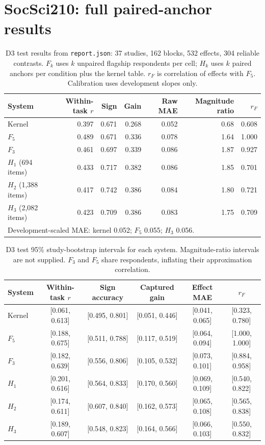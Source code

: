 \documentclass[11pt]{article}
\begin{document}
\section{SocSci210: full paired-anchor results}\label{app:d3}
\begin{table}[!htbp]
\centering\small
\caption{D3 test results from \texttt{report.json}: 37 studies, 162 blocks, 532 effects, 304 reliable contrasts. $F_k$ uses $k$ unpaired flagship respondents per cell; $H_k$ uses $k$ paired anchors per condition plus the kernel table. $r_F$ is correlation of effects with $F_5$. Calibration uses development slopes only.}
\begin{tabular}{lrrrrrr}
\toprule
System & Within-task $r$ & Sign & Gain & Raw MAE & Magnitude ratio & $r_F$\\
\midrule
Kernel & 0.397 & 0.671 & 0.268 & 0.052 & 0.68 & 0.608\\
$F_5$ & 0.489 & 0.671 & 0.336 & 0.078 & 1.64 & 1.000\\
$F_3$ & 0.461 & 0.697 & 0.339 & 0.086 & 1.87 & 0.927\\
$H_1$ (694 items) & 0.433 & 0.717 & 0.382 & 0.086 & 1.85 & 0.701\\
$H_2$ (1,388 items) & 0.417 & 0.742 & 0.386 & 0.084 & 1.80 & 0.721\\
$H_3$ (2,082 items) & 0.423 & 0.709 & 0.386 & 0.083 & 1.75 & 0.709\\
\midrule
\multicolumn{7}{l}{Development-scaled MAE: kernel 0.052; $F_5$ 0.055; $H_3$ 0.056.}\\
\bottomrule
\end{tabular}
\end{table}
\begin{table}[!htbp]
\centering\footnotesize
\caption{D3 test 95\% study-bootstrap intervals for each system. Magnitude-ratio intervals are not supplied. $F_3$ and $F_5$ share respondents, inflating their approximation correlation.}
\begin{tabular}{lccccc}
\toprule
System & Within-task $r$ & Sign accuracy & Captured gain & Effect MAE & $r_F$\\
\midrule
Kernel & [0.061, 0.613] & [0.495, 0.801] & [0.051, 0.446] & [0.041, 0.065] & [0.323, 0.780]\\
$F_5$ & [0.188, 0.675] & [0.511, 0.788] & [0.117, 0.519] & [0.064, 0.094] & [1.000, 1.000]\\
$F_3$ & [0.182, 0.639] & [0.556, 0.806] & [0.105, 0.532] & [0.073, 0.101] & [0.884, 0.958]\\
$H_1$ & [0.201, 0.616] & [0.564, 0.833] & [0.170, 0.560] & [0.069, 0.109] & [0.540, 0.822]\\
$H_2$ & [0.174, 0.611] & [0.607, 0.840] & [0.162, 0.573] & [0.065, 0.108] & [0.565, 0.838]\\
$H_3$ & [0.189, 0.607] & [0.548, 0.823] & [0.164, 0.566] & [0.066, 0.103] & [0.550, 0.832]\\
\bottomrule
\end{tabular}
\end{table}
\end{document}
